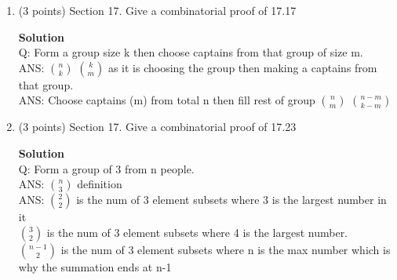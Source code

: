 \documentclass[12pt]{article}
\begin{document}
\begin{enumerate}
\item (3 points) Section 17.  Give a combinatorial proof of 17.17 

\textbf{Solution}\\ 
Q: Form a group size k then choose captains from that group of size m. \\ 
ANS: $n \choose k$ $k \choose m$ as it is choosing the group then making a captains from that group. \\ 
ANS: Choose captains (m) from total n then fill rest of group  $n \choose m$ $n-m \choose k-m$


\item (3 points) Section 17.  Give a combinatorial proof of 17.23 

\textbf{Solution} \\ 
Q: Form a group of 3 from n people.  \\
ANS: $n \choose 3$ definition \\
ANS: $2 \choose 2$ is the num of 3 element subsets where 3 is the largest number in it \\
$3 \choose 2$ is the num of 3 element subsets where 4 is the largest number. \\ 
$n-1 \choose 2$ is the num of 3 element subsets where n is the max number which is why the summation ends at n-1

\end{enumerate}
\end{document}
